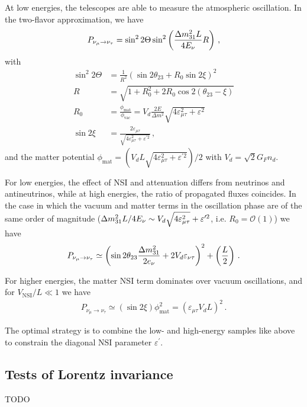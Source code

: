 \documentclass[twocolumn]{article}
\newcommand{\nmt}{\ensuremath{\nu_\mu \to \nu_\tau}}
\renewcommand{\th}[1][]{%
  \theta\ifx\\#1\\\else_\text{#1}\fi
}
\renewcommand{\t}[1]{\ensuremath{\text{{#1}}}}
\newcommand*{\dm}[1][]{%
  \Delta m^2\ifx\\#1\\\else_\text{#1}\fi
}
\begin{document}
At low energies, the telescopes are able to measure the atmospheric oscillation. In the two-flavor approximation, we have
\begin{align*}
  P_{\nmt} = \sin^2 2\Theta \sin^2 \left( \frac{\dm[31]L}{4E_\nu}R \right)  
\,,\end{align*}
with
\begin{align*}
\sin ^{2} 2 \Theta &=\frac{1}{R^{2}}\left(\sin 2 \theta_{23}+R_{0} \sin 2 \xi\right)^{2} \\
R &=\sqrt{1+R_{0}^{2}+2 R_{0} \cos 2\left(\theta_{23}-\xi\right)} \\
R_{0} &=\frac{\phi_{\operatorname{mat}}}{\phi_{\mathrm{vac}}}=V_{d} \frac{2 E}{\Delta m^{2}} \sqrt{4 \varepsilon_{\mu \tau}^{2}+\varepsilon^{2}} \\
\sin 2 \xi &=\frac{2 \varepsilon_{\mu \tau}}{\sqrt{4 \varepsilon_{\mu \tau}^{2}+\varepsilon^{\prime 2}}}
\,,\end{align*}
and the matter potential $\phi_{\mathrm{mat}}=\left(V_{d} L \sqrt{4 \varepsilon_{\mu \tau}^{2}+\varepsilon^{\prime 2}}\right) / 2$ with $V_d = \sqrt{2}G_F n_d$. 

For low energies, the effect of NSI and attenuation differs from neutrinos and antineutrinos, while at high energies, the ratio of propagated fluxes coincides. In the case in which the vacuum and matter terms in the oscillation phase are of the same order of magnitude ($\dm[31]L/4E_\nu \sim V_d \sqrt{4\varepsilon^2_{\mu \tau}} + \varepsilon^{\prime 2} $, i.e. $R_0 = \mathcal{O} (1)$) we have
\begin{align*}
  P_{\nmt} \simeq \left( \sin 2 \th[23] \frac{\dm[31]}{2e_\nu} + 2V_d \varepsilon_{\nu \tau} \right)^2 + \left( \frac{L}{2} \right) 
\,.\end{align*}

For higher energies, the matter NSI term dominates over vacuum oscillations, and for $V_\t{NSI}/L \ll 1$ we have
\begin{align*}
  P_{\nmt} \simeq (\sin 2\xi)\phi_\t{mat}^2= (\varepsilon_{\mu\tau}V_d L)^2
\,.\end{align*}

The optimal strategy is to combine the low- and high-energy samples like above to constrain the diagonal NSI parameter $\varepsilon^\prime$. 

\subsection*{Tests of Lorentz invariance}
TODO
\end{document}
